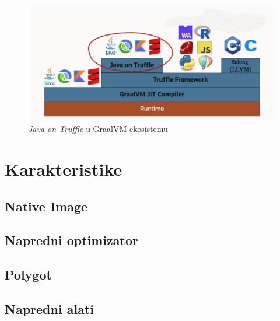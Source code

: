 \documentclass[a4paper]{article}
\begin{document}
\begin{figure}
	\begin{center}
	\includegraphics[scale=0.35]{imgs/java_on_truffle.png}
	\end{center}
	\caption{\emph{Java on Truffle} u GraalVM ekosistemu}
	\label{fig: java on truffle}
\end{figure}



\section{Karakteristike}
\label{sec:Karakteristike}

\subsection{Native Image}
\label{sub:Native Image}

\subsection{Napredni optimizator}
\label{sub:Napredni optimizator}

\subsection{Polygot}
\label{sub:Polygot}


\subsection{Napredni alati}
\label{sub:Napredni alati}
\end{document}
